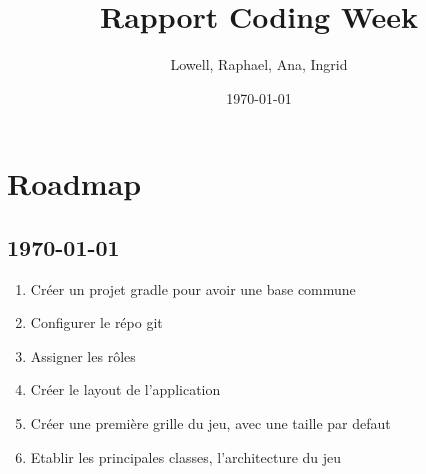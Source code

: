 \documentclass[12pt]{article}
\title{Rapport Coding Week}
\author{Lowell, Raphael, Ana, Ingrid}
\date{\today}
\theoremstyle{definition}
\theoremstyle{definition}
\theoremstyle{remark}
\theoremstyle{remark}
\theoremstyle{definition}
\theoremstyle{remark}
\begin{document}
\maketitle
\tableofcontents
\newpage
{}

\section{Roadmap} 

\subsection{\today}

\begin{enumerate}
    \item Créer un projet gradle pour avoir une base commune
    \item Configurer le répo git
    \item Assigner les rôles
    \item Créer le layout de l'application
    \item Créer une première grille du jeu, avec une taille par defaut
    \item Etablir les principales classes, l'architecture du jeu
\end{enumerate}
\end{document}
